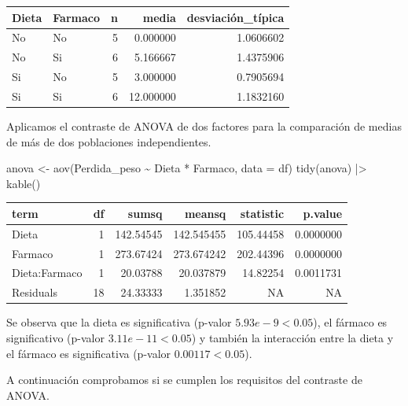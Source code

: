 \documentclass[
  spanish,
  a4paper,
]{scrreport}
\newenvironment{Shaded}{\begin{snugshade}}{\end{snugshade}}
\newcommand{\AttributeTok}[1]{\textcolor[rgb]{0.40,0.45,0.13}{#1}}
\newcommand{\FunctionTok}[1]{\textcolor[rgb]{0.28,0.35,0.67}{#1}}
\newcommand{\NormalTok}[1]{\textcolor[rgb]{0.00,0.23,0.31}{#1}}
\newcommand{\OtherTok}[1]{\textcolor[rgb]{0.00,0.23,0.31}{#1}}
\newcommand{\SpecialCharTok}[1]{\textcolor[rgb]{0.37,0.37,0.37}{#1}}
\newcounter{none} %
\theoremstyle{definition}
\theoremstyle{remark}
\begin{document}
\begin{tcolorbox}
{\def\LTcaptype{none} %
\begin{longtable}[]{@{}llrrr@{}}
\toprule\noalign{}
Dieta & Farmaco & n & media & desviación\_típica \\
\midrule\noalign{}
\endhead
\bottomrule\noalign{}
\endlastfoot
No & No & 5 & 0.000000 & 1.0606602 \\
No & Si & 6 & 5.166667 & 1.4375906 \\
Si & No & 5 & 3.000000 & 0.7905694 \\
Si & Si & 6 & 12.000000 & 1.1832160 \\
\end{longtable}
}

Aplicamos el contraste de ANOVA de dos factores para la comparación de
medias de más de dos poblaciones independientes.

\begin{Shaded}
\begin{Highlighting}[]
\NormalTok{anova }\OtherTok{\textless{}{-}} \FunctionTok{aov}\NormalTok{(Perdida\_peso }\SpecialCharTok{\textasciitilde{}}\NormalTok{ Dieta }\SpecialCharTok{*}\NormalTok{ Farmaco, }\AttributeTok{data =}\NormalTok{ df)}
\FunctionTok{tidy}\NormalTok{(anova) }\SpecialCharTok{|\textgreater{}} 
    \FunctionTok{kable}\NormalTok{()}
\end{Highlighting}
\end{Shaded}

{\def\LTcaptype{none} %
\begin{longtable}[]{@{}lrrrrr@{}}
\toprule\noalign{}
term & df & sumsq & meansq & statistic & p.value \\
\midrule\noalign{}
\endhead
\bottomrule\noalign{}
\endlastfoot
Dieta & 1 & 142.54545 & 142.545455 & 105.44458 & 0.0000000 \\
Farmaco & 1 & 273.67424 & 273.674242 & 202.44396 & 0.0000000 \\
Dieta:Farmaco & 1 & 20.03788 & 20.037879 & 14.82254 & 0.0011731 \\
Residuals & 18 & 24.33333 & 1.351852 & NA & NA \\
\end{longtable}
}

Se observa que la dieta es significativa (p-valor \(5.93e-9 < 0.05\)),
el fármaco es significativo (p-valor \(3.11e-11 < 0.05\)) y también la
interacción entre la dieta y el fármaco es significativa (p-valor
\(0.00117 < 0.05\)).

A continuación comprobamos si se cumplen los requisitos del contraste de
ANOVA.


\end{tcolorbox}
\end{document}
